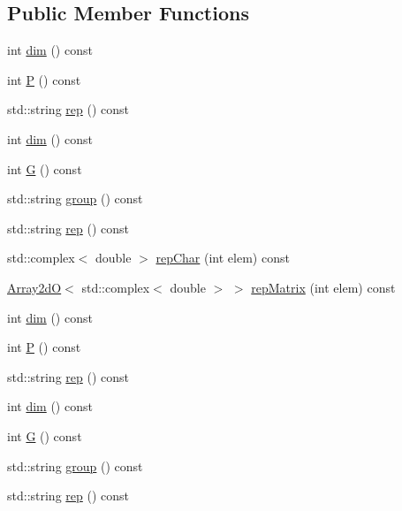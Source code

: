 \subsection*{Public Member Functions}
\begin{DoxyCompactItemize}
\item 
int \mbox{\hyperlink{structHadron_1_1HuRep_aa222968e65bfc228eb9acf15a7df0388}{dim}} () const
\item 
int \mbox{\hyperlink{structHadron_1_1HuRep_a6cae988c8d4cbcc28b9573502f672900}{P}} () const
\item 
std\+::string \mbox{\hyperlink{structHadron_1_1HuRep_a4c8b93e1cd7db1a4bacd489f7bb90dbd}{rep}} () const
\item 
int \mbox{\hyperlink{structHadron_1_1HuRep_aa222968e65bfc228eb9acf15a7df0388}{dim}} () const
\item 
int \mbox{\hyperlink{structHadron_1_1HuRep_a6486cf33fe424a2226d6fbb2dd7b7d3c}{G}} () const
\item 
std\+::string \mbox{\hyperlink{structHadron_1_1HuRep_ace31fc18f9795a65589ec7014517ac33}{group}} () const
\item 
std\+::string \mbox{\hyperlink{structHadron_1_1HuRep_a4c8b93e1cd7db1a4bacd489f7bb90dbd}{rep}} () const
\item 
std\+::complex$<$ double $>$ \mbox{\hyperlink{structHadron_1_1HuRep_a764617bf3dabef7cd69ffa034e550fff}{rep\+Char}} (int elem) const
\item 
\mbox{\hyperlink{classADAT_1_1Array2dO}{Array2dO}}$<$ std\+::complex$<$ double $>$ $>$ \mbox{\hyperlink{structHadron_1_1HuRep_a744a3604c724067d8912075d0d8acf59}{rep\+Matrix}} (int elem) const
\item 
int \mbox{\hyperlink{structHadron_1_1HuRep_aa222968e65bfc228eb9acf15a7df0388}{dim}} () const
\item 
int \mbox{\hyperlink{structHadron_1_1HuRep_a6cae988c8d4cbcc28b9573502f672900}{P}} () const
\item 
std\+::string \mbox{\hyperlink{structHadron_1_1HuRep_a4c8b93e1cd7db1a4bacd489f7bb90dbd}{rep}} () const
\item 
int \mbox{\hyperlink{structHadron_1_1HuRep_aa222968e65bfc228eb9acf15a7df0388}{dim}} () const
\item 
int \mbox{\hyperlink{structHadron_1_1HuRep_a6486cf33fe424a2226d6fbb2dd7b7d3c}{G}} () const
\item 
std\+::string \mbox{\hyperlink{structHadron_1_1HuRep_ace31fc18f9795a65589ec7014517ac33}{group}} () const
\item 
std\+::string \mbox{\hyperlink{structHadron_1_1HuRep_a4c8b93e1cd7db1a4bacd489f7bb90dbd}{rep}} () const

\end{DoxyCompactItemize}
